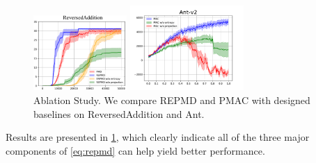 \begin{figure}[t]
\begin{minipage}{0.5\linewidth}
\raggedleft
\includegraphics[width=1.4in]{./ablation.pdf}
\end{minipage}%
\begin{minipage}{0.5\linewidth}
\includegraphics[width=1.7in]{./mujoco-ablation.pdf}
\end{minipage}%
\caption{Ablation Study. We compare REPMD and PMAC with designed baselines on ReversedAddition and Ant. }
\label{fig:ablation}
\end{figure}

Results are presented in \cref{fig:ablation}, which clearly indicate all of the three major components of \cref{eq:repmd} can help yield better performance. 

